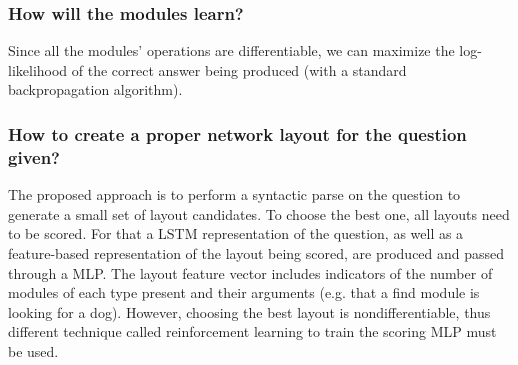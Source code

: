 \documentclass[a4paper]{article}
\begin{document}
\begin{multicols}{2}
\subsubsection*{How will the modules learn?}
    Since all the modules' operations are differentiable, we can maximize the log-likelihood of the correct answer being produced (with a standard backpropagation algorithm).

\subsubsection*{How to create a proper network layout for the question given?}
    The proposed approach is to perform a syntactic parse on the question to generate a small set of layout candidates. To choose the best one, all layouts need to be scored. For that a LSTM representation of the question, as well as a feature-based representation of the layout being scored, are produced and passed through a MLP. The layout feature vector includes indicators of the number of modules of each type present and their arguments (e.g. that a find module is looking for a dog).
 However, choosing the best layout is nondifferentiable, thus different technique called reinforcement learning to train the scoring MLP must be used.

\end{multicols}
\end{document}
